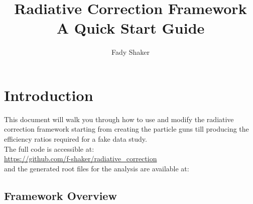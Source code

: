 \documentclass[12pt]{report}
\title{Radiative Correction Framework\\ A Quick Start Guide}
\author{Fady Shaker}
\begin{document}
\maketitle
\tableofcontents
\newpage
\section{Introduction}
This document will walk you through how to use and modify the radiative correction framework starting from creating the particle guns till producing the efficiency ratios required for a fake data study.\\

The full code is accessible at:\\
\url{https://github.com/f-shaker/radiative_correction}\\
and the generated root files for the analysis are available at:\\

\subsection{Framework Overview}
\begin{figure}[!ht]
\end{figure}
\end{document}
